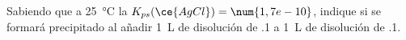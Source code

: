 Sabiendo que a \SI{25}{\celsius} la $K_{ps}(\ce{AgCl})=\num{1,7e-10}$, indique si se formará precipitado al añadir \SI{1}{\liter} de disolución de  \SI{,1}{\Molar} a \SI{1}{\liter} de disolución de  \SI{,1}{\Molar}.
